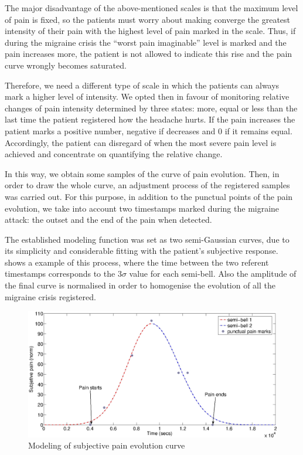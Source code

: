 The major disadvantage of the above-mentioned scales is that the
maximum level of pain is fixed, so the patients must worry about
making converge the greatest intensity of their pain with the highest
level of pain marked in the scale. Thus, if during the migraine crisis
the ``worst pain imaginable'' level is marked and the pain increases
more, the patient is not allowed to indicate this rise and the pain
curve wrongly becomes saturated.

Therefore, we need a different type of scale in which the patients can
always mark a higher level of intensity. We opted then in favour of
monitoring relative changes of pain intensity determined by three
states: more, equal or less than the last time the patient registered
how the headache hurts.  If the pain increases the patient marks a
positive number, negative if decreases and 0 if it remains
equal. Accordingly, the patient can disregard of when the most severe
pain level is achieved and concentrate on quantifying the relative
change.

In this way, we obtain some samples of the curve of pain evolution.
Then, in order to draw the whole curve, an adjustment process of the
registered samples was carried out.  For this purpose, in addition to
the punctual points of the pain evolution, we take into account two
timestamps marked during the migraine attack: the outset and the end
of the pain when detected.

The established modeling function was set as two semi-Gaussian curves,
due to its simplicity and considerable fitting with the patient's
subjective response.  shows a example of this
process, where the time between the two referent timestamps
corresponds to the $3\sigma$ value for each semi-bell.  Also the
amplitude of the final curve is normalised in order to homogenise the
evolution of all the migraine crisis registered.

\begin{figure}[!ht]
\centering
\includegraphics[width=\textwidth]{images/paincurvereal}
\caption{Modeling of subjective pain evolution curve}
\label{fig:paincurve}
\end{figure}

